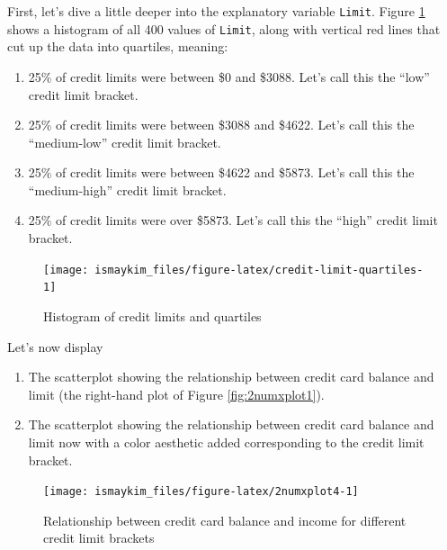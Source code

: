\documentclass[12pt,]{krantz}
\providecommand{\tightlist}{%
  \setlength{\itemsep}{0pt}\setlength{\parskip}{0pt}}
\theoremstyle{definition}
\theoremstyle{definition}
\theoremstyle{definition}
\theoremstyle{remark}
\begin{document}
First, let's dive a little deeper into the explanatory variable
\texttt{Limit}. Figure \ref{fig:credit-limit-quartiles} shows a
histogram of all 400 values of \texttt{Limit}, along with vertical red
lines that cut up the data into quartiles, meaning:

\begin{enumerate}
\def\labelenumi{\arabic{enumi}.}
\tightlist
\item
  25\% of credit limits were between \$0 and \$3088. Let's call this the
  ``low'' credit limit bracket.
\item
  25\% of credit limits were between \$3088 and \$4622. Let's call this
  the ``medium-low'' credit limit bracket.
\item
  25\% of credit limits were between \$4622 and \$5873. Let's call this
  the ``medium-high'' credit limit bracket.
\item
  25\% of credit limits were over \$5873. Let's call this the ``high''
  credit limit bracket.
\end{enumerate}

\begin{figure}

{\centering \texttt{[image: ismaykim\_files/figure-latex/credit-limit-quartiles-1]} 

}

\caption{Histogram of credit limits and quartiles}\label{fig:credit-limit-quartiles}
\end{figure}

Let's now display

\begin{enumerate}
\def\labelenumi{\arabic{enumi}.}
\tightlist
\item
  The scatterplot showing the relationship between credit card balance
  and limit (the right-hand plot of Figure \ref{fig:2numxplot1}).
\item
  The scatterplot showing the relationship between credit card balance
  and limit now with a color aesthetic added corresponding to the credit
  limit bracket.
\end{enumerate}

\begin{figure}

{\centering \texttt{[image: ismaykim\_files/figure-latex/2numxplot4-1]} 

}

\caption{Relationship between credit card balance and income for different credit limit brackets}\label{fig:2numxplot4}
\end{figure}
\end{document}
